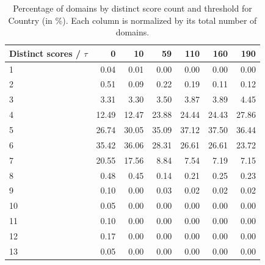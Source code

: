 \begin{table}[htbp]
\centering
\small
\begin{tabular}{l r r r r r r}
\hline
Distinct scores / $\tau$ & 0 & 10 & 59 & 110 & 160 & 190 \\
\hline
1 & 0.04 & 0.01 & 0.00 & 0.00 & 0.00 & 0.00 \\
2 & 0.51 & 0.09 & 0.22 & 0.19 & 0.11 & 0.12 \\
3 & 3.31 & 3.30 & 3.50 & 3.87 & 3.89 & 4.45 \\
4 & 12.49 & 12.47 & 23.88 & 24.44 & 24.43 & 27.86 \\
5 & 26.74 & 30.05 & 35.09 & 37.12 & 37.50 & 36.44 \\
6 & 35.42 & 36.06 & 28.31 & 26.61 & 26.61 & 23.72 \\
7 & 20.55 & 17.56 & 8.84 & 7.54 & 7.19 & 7.15 \\
8 & 0.48 & 0.45 & 0.14 & 0.21 & 0.25 & 0.23 \\
9 & 0.10 & 0.00 & 0.03 & 0.02 & 0.02 & 0.02 \\
10 & 0.05 & 0.00 & 0.00 & 0.00 & 0.00 & 0.00 \\
11 & 0.10 & 0.00 & 0.00 & 0.00 & 0.00 & 0.00 \\
12 & 0.17 & 0.00 & 0.00 & 0.00 & 0.00 & 0.00 \\
13 & 0.05 & 0.00 & 0.00 & 0.00 & 0.00 & 0.00 \\
\hline
\end{tabular}
\caption{Percentage of domains by distinct score count and threshold for Country (in \%). Each column is normalized by its total number of domains.}
\label{tab:distinct-scores-percentages-Country}
\end{table}
